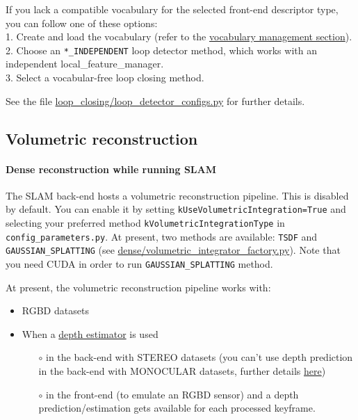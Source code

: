 \documentclass{article}
\let\oldparagraph\paragraph
\renewcommand{\paragraph}[1]{\oldparagraph{#1}\mbox{}}
\begin{document}
If you lack a compatible vocabulary for the selected front-end
descriptor type, you can follow one of these options:\\
1. Create and load the vocabulary (refer to the
\protect\hyperlink{vocabulary-management}{vocabulary management
section}).\\
2. Choose an \texttt{*\_INDEPENDENT} loop detector method, which works
with an independent local\_feature\_manager.\\
3. Select a vocabular-free loop closing method.

See the file \url{loop_closing/loop_detector_configs.py} for further
details.

\hypertarget{volumetric-reconstruction}{%
\subsection{Volumetric reconstruction}\label{volumetric-reconstruction}}

\hypertarget{dense-reconstruction-while-running-slam}{%
\paragraph{Dense reconstruction while running
SLAM}\label{dense-reconstruction-while-running-slam}}

The SLAM back-end hosts a volumetric reconstruction pipeline. This is
disabled by default. You can enable it by setting
\texttt{kUseVolumetricIntegration=True} and selecting your preferred
method \texttt{kVolumetricIntegrationType} in
\texttt{config\_parameters.py}. At present, two methods are available:
\texttt{TSDF} and \texttt{GAUSSIAN\_SPLATTING} (see
\url{dense/volumetric_integrator_factory.py}). Note that you need CUDA
in order to run \texttt{GAUSSIAN\_SPLATTING} method.

At present, the volumetric reconstruction pipeline works with:
\begin{itemize}
\item RGBD datasets 
\item When a \protect\hyperlink{depth-prediction}{depth estimator}
is used
\begin{itemize}
\item[$\circ$] in the back-end with STEREO datasets (you can't use depth
prediction in the back-end with MONOCULAR datasets, further details
\protect\hyperlink{depth-prediction}{here}) 
\item[$\circ$] in the front-end (to emulate an RGBD sensor) and a depth prediction/estimation gets available
for each processed keyframe.
\end{itemize}
\end{itemize}
\end{document}
